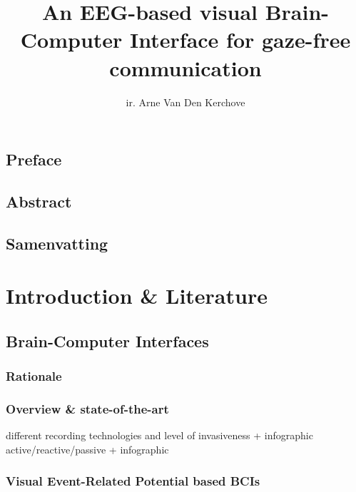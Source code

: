%
\usepackage{todonotes}
\usepackage{lipsum}
\usepackage{hyperref}
\usepackage{tabularx}
\usepackage{booktabs}



\usepackage[backend=biber]{biblatex}


\title{\sffamily An EEG-based visual Brain-Computer Interface for gaze-free communication}
\author{ir. Arne Van Den Kerchove}




\frontmatter

\chapter{Preface}
\lipsum[1]
\chapter{Abstract}
\lipsum[2-4]
\chapter{Samenvatting}
\lipsum[5-7]
\tableofcontents
\listoffigures
\listoftables



\mainmatter


\part{Introduction \& Literature}

\chapter{Brain-Computer Interfaces}
\begin{refsection}
\section{Rationale}
\section{Overview \& state-of-the-art}
different recording technologies and level of invasiveness + infographic
active/reactive/passive + infographic
\section{Visual Event-Related Potential based BCIs}
\printbibliography[heading=subbibliography]
\end{refsection}

